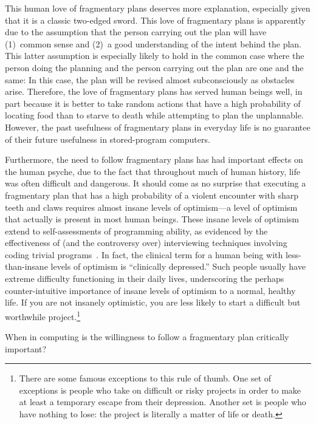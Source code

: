 This human love of fragmentary plans deserves more explanation,
especially given that it is a classic two-edged sword.
This love of fragmentary plans is apparently due to the assumption that
the person carrying out the plan will have (1)~common sense and (2)~a good
understanding of the intent behind the plan.
This latter assumption is especially likely to hold in the common case
where the person doing the planning and the person carrying out the plan
are one and the same:  In this case, the plan will be revised almost
subconsciously as obstacles arise.
Therefore, the love of fragmentary plans has served human beings well,
in part because it is better to take random actions that have a high
probability of locating food than to starve to death while attempting
to plan the unplannable.
However, the past usefulness of fragmentary plans in everyday life is
no guarantee of their future usefulness in stored-program computers.

Furthermore, the need to follow fragmentary plans has had important effects
on the human psyche, due to the fact
that throughout much of human history, life was often difficult and dangerous.
It should come as no surprise that executing a fragmentary plan that has
a high probability of a violent encounter with sharp teeth and claws
requires almost insane levels of optimism---a level of optimism that actually
is present in most human beings.
These insane levels of optimism extend to self-assessments of programming
ability, as evidenced by the effectiveness of (and the controversy over)
interviewing techniques involving coding trivial
programs~\cite{RegBraithwaite2007FizzBuzz}.
In fact, the clinical term for a human being with less-than-insane
levels of optimism is ``clinically depressed.'' Such people usually have
extreme difficulty functioning in their daily lives, underscoring the
perhaps counter-intuitive importance of insane levels of optimism to a
normal, healthy life.
If you are not insanely optimistic, you are less likely to start a difficult
but worthwhile project.\footnote{
	There are some famous exceptions to this rule of thumb.
	One set of exceptions is people who take on difficult or risky
	projects in order to make at least a temporary escape
	from their depression.
	Another set is people who have nothing to lose: the project is
	literally a matter of life or death.}

\QuickQuiz{}
	When in computing is the willingness to follow a fragmentary
	plan critically important?
 \QuickQuizEnd

